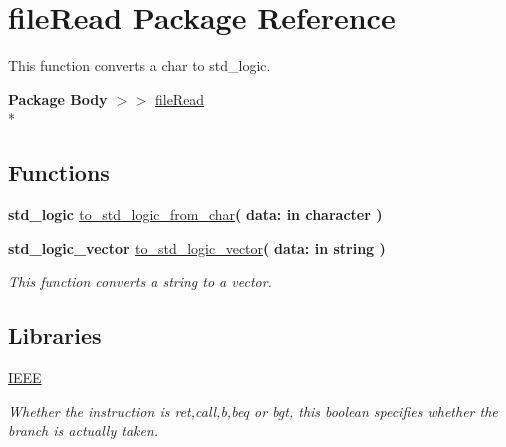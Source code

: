 \hypertarget{classfile_read}{\section{file\-Read Package Reference}
\label{classfile_read}
}


This function converts a char to std\-\_\-logic.  


{\bfseries Package Body $>$$>$ }\hyperlink{class__file_read}{file\-Read}\\*
\subsection*{Functions}
 \begin{DoxyCompactItemize}
\item 
\hypertarget{classfile_read_a130c40cc008de8d3ccb7e18201a712b9}{{\bfseries {\bfseries \textcolor{comment}{std\-\_\-logic}\textcolor{vhdlchar}{ }}} \hyperlink{classfile_read_a130c40cc008de8d3ccb7e18201a712b9}{to\-\_\-std\-\_\-logic\-\_\-from\-\_\-char}{\bfseries  ( }{\bfseries \textcolor{vhdlchar}{data\-: }\textcolor{stringliteral}{in }{\bfseries \textcolor{comment}{character}\textcolor{vhdlchar}{ }}}{\bfseries  )} }\label{classfile_read_a130c40cc008de8d3ccb7e18201a712b9}

\item 
\hypertarget{classfile_read_a2f37cc7e400e439a39996222cc6c4773}{{\bfseries {\bfseries \textcolor{comment}{std\-\_\-logic\-\_\-vector}\textcolor{vhdlchar}{ }}} \hyperlink{classfile_read_a2f37cc7e400e439a39996222cc6c4773}{to\-\_\-std\-\_\-logic\-\_\-vector}{\bfseries  ( }{\bfseries \textcolor{vhdlchar}{data\-: }\textcolor{stringliteral}{in }{\bfseries \textcolor{comment}{string}\textcolor{vhdlchar}{ }}}{\bfseries  )} }\label{classfile_read_a2f37cc7e400e439a39996222cc6c4773}

\begin{DoxyCompactList}\small\item\em This function converts a string to a vector. \end{DoxyCompactList}\end{DoxyCompactItemize}
\subsection*{Libraries}
 \begin{DoxyCompactItemize}
\item 
\hypertarget{classfile_read_ae4f03c286607f3181e16b9aa12d0c6d4}{\hyperlink{classfile_read_ae4f03c286607f3181e16b9aa12d0c6d4}{I\-E\-E\-E} }\label{classfile_read_ae4f03c286607f3181e16b9aa12d0c6d4}

\begin{DoxyCompactList}\small\item\em Whether the instruction is ret,call,b,beq or bgt, this boolean specifies whether the branch is actually taken. \end{DoxyCompactList}\end{DoxyCompactItemize}
